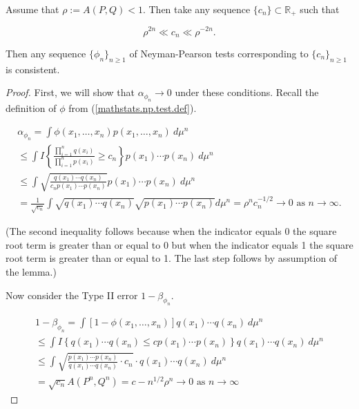 \begin{theorem}

Assume that \(\rho := A(P,Q) < 1\). Then take any sequence \(\{c_n\} \subset \mathbb{R}_+\) such that 

\begin{equation}\label{mathstats.cons.np.a}
\rho^{2n} \ll c_n \ll \rho^{-2n}.
\end{equation}

Then any sequence \(\{\phi_n\}_{n \geq 1}\) of Neyman-Pearson tests corresponding to \(\{c_n\}_{n \geq 1}\) is consistent. 

\end{theorem}

\begin{proof}

First, we will show that \(\alpha_{\phi_n} \to 0\) under these conditions. Recall the definition of \(\phi\) from (\ref{mathstats.np.test.def}). 

\begin{multline*}
\alpha_{\phi_n}  = \int \phi(x_1, \ldots, x_n) p(x_1, \ldots, x_n) \ d \mu^n \\
\leq \int I  \left\{  \frac{ \prod_{i=1}^n q(x_i)}{ \prod_{i=1}^n p(x_i)} \geq c_n \right\} p(x_1) \cdots p(x_n)  \ d\mu^n \\
\leq \int  \sqrt{\frac{ q(x_1) \cdots q(x_n)}{c_n p(x_1) \cdots p(x_n) } }  p(x_1) \cdots p(x_n) \ d \mu^n \\
= \frac{1}{\sqrt{c_n}} \int \sqrt{q(x_1) \cdots q(x_n)} \sqrt{ p(x_1) \cdots p(x_n)} d \mu^n = \rho^n c_n^{-1/2}  \to 0 \text{ as } n \to \infty.
\end{multline*}



(The second inequality follows because when the indicator equals 0 the square root term is greater than or equal to 0 but when the indicator equals 1 the square root term is greater than or equal to 1. The last step follows by assumption of the lemma.)

Now consider the Type II error \(1 - \beta_{\phi_n}\). 

\begin{multline*}
1 - \beta_{\phi_n} = \int [1 - \phi(x_1, \ldots, x_n)]q(x_1) \cdots q(x_n) \ d\mu^n \\
\leq \int I \left\{q(x_1) \cdots q(x_n) \leq c p(x_1) \cdots p(x_n) \right\} q(x_1) \cdots q(x_n) \ d\mu^n \\
\leq  \int  \sqrt{\frac{ p(x_1) \cdots p(x_n)}{q(x_1) \cdots q(x_n) }  \cdot c_n  }  \cdot q(x_1) \cdots q(x_n) \ d \mu^n  \\
= \sqrt{c_n} A(P^n, Q^n) = c-n^{1/2} \rho^n \to 0 \text{ as } n \to \infty
\end{multline*}

\end{proof}

